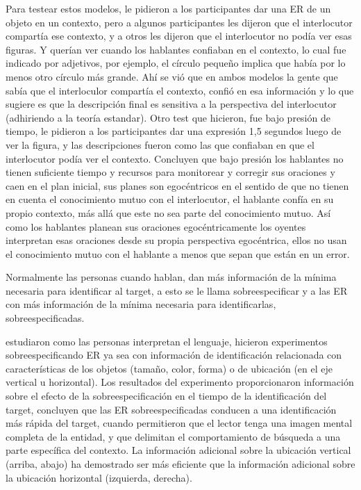 Para testear estos modelos, le pidieron a los participantes dar una ER de un objeto en un contexto, pero a algunos participantes les dijeron que el interlocutor compart\'ia ese contexto, y a otros les dijeron que el interlocutor no pod\'ia ver esas figuras. Y quer\'ian ver cuando los hablantes confiaban en el contexto, lo cual fue indicado por adjetivos, por ejemplo, el c\'irculo peque\~no implica que hab\'ia por lo menos otro c\'irculo m\'as grande. Ah\'i se vi\'o que en ambos modelos la gente que sab\'ia que el interloculor compart\'ia el contexto, confi\'o en esa informaci\'on y lo que sugiere es que la descripci\'on final es sensitiva a la perspectiva del interlocutor (adhiriendo a la teor\'ia estandar). Otro test que hicieron, fue bajo presi\'on de tiempo, le pidieron a los participantes dar una expresi\'on 1,5 segundos luego de ver la figura, y las descripciones fueron como las que confiaban en que el interlocutor pod\'ia ver el contexto. Concluyen que bajo presi\'on los hablantes no tienen suficiente tiempo y recursos para monitorear y corregir sus oraciones y caen en el plan inicial, sus planes son egoc\'entricos en el sentido de que no tienen en cuenta el conocimiento mutuo con el interlocutor, el hablante conf\'ia en su propio contexto, m\'as all\'a que este no sea parte del conocimiento mutuo. As\'i como los hablantes planean sus oraciones egoc\'entricamente los oyentes interpretan esas oraciones desde su propia perspectiva egoc\'entrica, ellos no usan el conocimiento mutuo con el hablante a menos que sepan que est\'an en un error.



Normalmente las personas cuando hablan, dan m\'as informaci\'on de la m\'inima necesaria para identificar al target, a esto se le llama sobreespecificar y a las ER con m\'as informaci\'on de la m\'inima necesaria para identificarlas, sobreespecificadas. 

\cite{arts} estudiaron como las personas interpretan el lenguaje, 
hicieron experimentos sobreespecificando ER ya sea con informaci\'on de identificaci\'on relacionada con caracter\'isticas de los objetos (tama\~no, color, forma) o de ubicaci\'on (en el eje vertical u horizontal). Los resultados del experimento
proporcionaron informaci\'on sobre el efecto de la sobreespecificaci\'on en el tiempo de la identificaci\'on del target,
concluyen que las ER sobreespecificadas conducen a una identificaci\'on m\'as r\'apida del target, cuando permitieron que el lector 
tenga una imagen mental completa de la entidad, y que delimitan el comportamiento de b\'usqueda a una parte espec\'ifica
del contexto. La informaci\'on adicional sobre la ubicaci\'on vertical (arriba, abajo) ha demostrado ser
m\'as eficiente que la informaci\'on adicional sobre la ubicaci\'on horizontal (izquierda, derecha).


